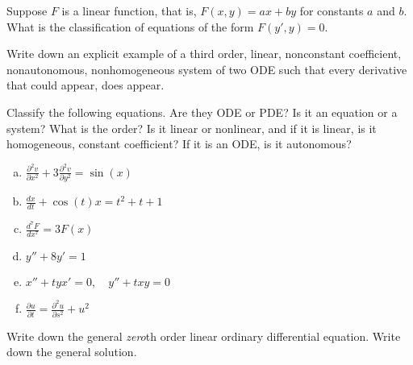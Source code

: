 \begin{exercise}
Suppose $F$ is a linear function, that is,
$F(x,y) = ax+by$ for constants $a$ and $b$.  What is the
classification of equations of the form $F(y',y) = 0$.
\end{exercise}

\begin{exercise}
Write down an explicit example of a third order, linear, nonconstant coefficient,
nonautonomous, nonhomogeneous system of two ODE such that every derivative
that could appear, does appear.
\end{exercise}

\setcounter{exercise}{100}

\pagebreak[2]
\begin{exercise}
Classify the following equations.  Are they ODE or PDE?  Is it an equation
or a system?  What is the order?  Is it linear or nonlinear, and if it is
linear, is it homogeneous, constant coefficient?  If it is an ODE\@, is it
autonomous?
\begin{enumerate}[a)]
\item $\displaystyle \frac{\partial^2 v}{\partial x^2} + 3 \frac{\partial^2
v}{\partial y^2} = \sin(x)$
\item $\displaystyle \frac{d x}{dt} + \cos(t) x = t^2+t+1$
\item $\displaystyle \frac{d^7 F}{dx^7} = 3F(x)$
\item $\displaystyle y''+8y'=1$
\item $\displaystyle x''+tyx'=0, \quad y''+txy = 0$
\item $\displaystyle \frac{\partial u}{\partial t} = \frac{\partial^2 u}{\partial s^2} + u^2$
\end{enumerate}
\end{exercise}

\begin{exercise}
Write down the general \emph{zero}th order linear ordinary differential
equation.  Write down the general solution.
\end{exercise}

